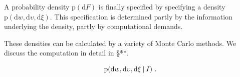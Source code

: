 \documentclass[\ifafour a4paper,12pt,\else a5paper,10pt,\fi%
onecolumn,oneside,article,%
british%
]{memoir}
\makeatletter
\theoremstyle{remark}
\theoremstyle{innote}
\def\sum{\DOTSI\sumop\slimits@}
\def\prod{\DOTSI\prodop\slimits@}
\newcommand*{\di}{\mathrm{d}}%
\newcommand*{\p}{\mathrm{p}}%
\renewcommand*{\|}[1][]{\nonscript\:#1\vert\nonscript\:\mathopen{}}
\newcommand*{\sect}{\S}%
\makeatother
\begin{document}


A probability density $\p(\di F)$ is finally specified by specifying a density $\p(\di w, \di\upsilon, \di\xi)$. This specification is determined partly by the information underlying the density, partly by computational demands.


These densities can be calculated by a variety of Monte Carlo methods. We discuss the computation in detail in \sect***.

\medskip

\begin{equation}
  \label{eq:density_coordsF}
   \p(\di w, \di\upsilon, \di\xi \|I) \ .
\end{equation}

 

\end{document}
